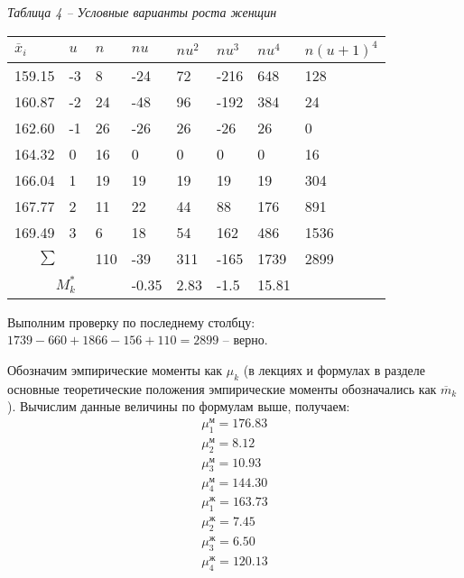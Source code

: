 \noindent\textit{Таблица 4 -- Условные варианты роста женщин}
\begin{longtable}{|p{1.7cm}|p{1.7cm}|p{1.7cm}|p{1.7cm}|p{1.7cm}|p{1.7cm}|p{1.7cm}|p{1.9cm}|}
    \hline
    $\overline{x}_i$ & $u$ & $n$ & $nu$ & $nu^2$ & $nu^3$ & $nu^4$ & $n(u+1)^4$ \\\hline
    159.15           & -3  & 8   & -24  & 72     & -216   & 648    & 128        \\\hline
    160.87           & -2  & 24  & -48  & 96     & -192   & 384    & 24         \\\hline
    162.60           & -1  & 26  & -26  & 26     & -26    & 26     & 0          \\\hline
    164.32           & 0   & 16  & 0    & 0      & 0      & 0      & 16         \\\hline
    166.04           & 1   & 19  & 19   & 19     & 19     & 19     & 304        \\\hline
    167.77           & 2   & 11  & 22   & 44     & 88     & 176    & 891        \\\hline
    169.49           & 3   & 6   & 18   & 54     & 162    & 486    & 1536       \\\hline
    \multicolumn{2}{|c|}{$\sum$} & 110 & -39 & 311 & -165 & 1739 & 2899 \\\hline
    \multicolumn{3}{|c|}{$M_k^*$} & -0.35 & 2.83 & -1.5 & 15.81 & \\\hline
\end{longtable}

Выполним проверку по последнему столбцу: $1739 - 660 + 1866 - 156 + 110 = 2899$ -- верно.

Обозначим эмпирические моменты как $\mu_k$ (в лекциях и формулах в разделе основные теоретические положения
эмпирические моменты обозначались как $\overline{m}_k$).
Вычислим данные величины по формулам выше, получаем:
\begin{gather*}
    \mu_1^{\text{м}} = 176.83 \\
    \mu_2^{\text{м}} = 8.12 \\
    \mu_3^{\text{м}} = 10.93 \\
    \mu_4^{\text{м}} = 144.30 \\
    \mu_1^{\text{ж}} = 163.73 \\
    \mu_2^{\text{ж}} = 7.45 \\
    \mu_3^{\text{ж}} = 6.50 \\
    \mu_4^{\text{ж}} = 120.13
\end{gather*}

